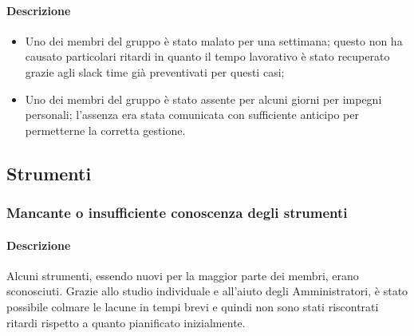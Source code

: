 \paragraph {Descrizione}
\begin{itemize}
	\item Uno dei membri del gruppo è stato malato per una settimana; questo non ha causato particolari ritardi in quanto il tempo lavorativo è stato recuperato grazie agli slack time già preventivati per questi casi;
	\item Uno dei membri del gruppo è stato assente per alcuni giorni per impegni personali; l'assenza era stata comunicata con sufficiente anticipo per permetterne la corretta gestione.
\end{itemize}

\subsection{Strumenti}
\subsubsection{Mancante o insufficiente conoscenza degli strumenti}
\paragraph {Descrizione}
Alcuni strumenti, essendo nuovi per la maggior parte dei membri, erano sconosciuti. Grazie allo studio individuale e all'aiuto degli Amministratori, è stato possibile colmare le lacune in tempi brevi e quindi non sono stati riscontrati ritardi rispetto a quanto pianificato inizialmente.